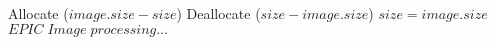 \documentclass[a4paper,conference]{IEEEtran}
\begin{document}
\begin{algorithmic}
\STATE Allocate ($image.size - size $)
\STATE Deallocate ($size - image.size $)
\ENDIF
\STATE $size = image.size$
\STATE $EPIC \; Image \; processing \dots$ 
\ENDWHILE
\end{algorithmic}
\end{document}
